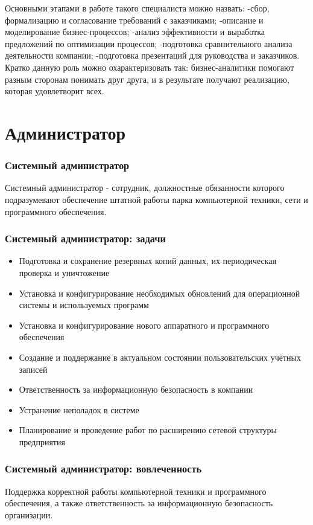 \documentclass{../industrial-development}
\begin{document}
		 Основными этапами в работе такого специалиста можно назвать: 
		 -сбор, формализацию и согласование требований с заказчиками; 
		 -описание и моделирование бизнес-процессов; 
		 -анализ эффективности и выработка предложений по оптимизации процессов; 
		 -подготовка сравнительного анализа деятельности компании; 
		 -подготовка презентаций для руководства и заказчиков. 
		 Кратко данную роль можно охарактеризовать так: бизнес-аналитики помогают разным сторонам понимать друг друга, и в результате получают реализацию, которая удовлетворит всех. 
	
	\section{Администратор} 
	
	\begin{frame} \frametitle{Системный администратор}
		\begin{block}{}
			\alert {Системный администратор} - сотрудник, должностные обязанности которого подразумевают обеспечение штатной работы парка компьютерной техники, сети и программного обеспечения.
		\end{block}
	\end{frame}
	
	\begin{frame} \frametitle{Системный администратор: задачи}
		\begin{itemize}
			\item Подготовка и сохранение резервных копий данных, их периодическая проверка и уничтожение
			\item Установка и конфигурирование необходимых обновлений для операционной системы и используемых программ
			\item Установка и конфигурирование нового аппаратного и программного обеспечения
			\item Создание и поддержание в актуальном состоянии пользовательских учётных записей
			\item Ответственность за информационную безопасность в компании
			\item Устранение неполадок в системе
			\item Планирование и проведение работ по расширению сетевой структуры предприятия
		\end{itemize}
	\end{frame}
	\begin{frame} \frametitle{Системный администратор: вовлеченность}
		Поддержка корректной работы компьютерной техники и программного обеспечения, а также ответственность за информационную безопасность организации.
	\end{frame}
	
\end{document}
